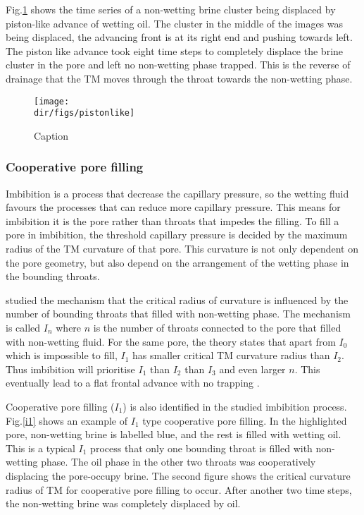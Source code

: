 Fig.\ref{pistonlike} shows the time series of a non-wetting brine cluster being displaced by piston-like advance of wetting oil. The cluster in the middle of the images was being displaced, the advancing front is at its right end and pushing towards left. The piston like advance took eight time steps to completely displace the brine cluster in the pore and left no non-wetting phase trapped. This is the reverse of drainage that the TM moves through the throat towards the non-wetting phase.

\begin{figure}
    \centering
    \texttt{[image: \\dir/figs/pistonlike]}
    \caption{Caption}
    \label{pistonlike}
\end{figure}

\subsubsection{Cooperative pore filling}\label{cooperativeporefilling}
Imbibition is a process that decrease the capillary pressure, so the wetting fluid favours the processes that can reduce more capillary pressure. This means for imbibition it is the pore rather than throats that impedes the filling. To fill a pore in imbibition, the threshold capillary pressure is decided by the maximum radius of the TM curvature of that pore. This curvature is not only dependent on the pore geometry, but also depend on the arrangement of the wetting phase in the bounding throats. 

\citep{lenormand1983mechanisms,lenormand1984role} studied the mechanism that the critical radius of curvature is influenced by the number of bounding throats that filled with non-wetting phase. The mechanism is called $I_n$ where $n$ is the number of throats connected to the pore that filled with non-wetting fluid. For the same pore, the theory states that apart from $I_0$ which is impossible to fill, $I_1$ has smaller critical TM curvature radius than $I_2$. Thus imbibition will prioritise $I_1$ than $I_2$ than $I_3$ and even larger $n$. This eventually lead to a flat frontal advance with no trapping \citet{blunt1992simulation}. 

Cooperative pore filling ($I_1$) is also identified in the studied imbibition process. Fig.\ref{i1} shows an example of $I_1$ type cooperative pore filling. In the highlighted pore, non-wetting brine is labelled blue, and the rest is filled with wetting oil. This is a typical $I_1$ process that only one bounding throat is filled with non-wetting phase. The oil phase in the other two throats was cooperatively displacing the pore-occupy brine. The second figure shows the critical curvature radius of TM for cooperative pore filling to occur. After another two time steps, the non-wetting brine was completely displaced by oil.

